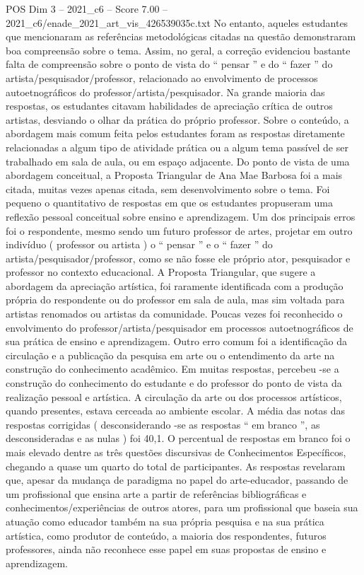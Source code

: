 \begin{textsample}{POS Dim 3 – 2021\_c6 – Score 7.00 – 2021\_c6/enade\_2021\_art\_vis\_426539035c.txt}
No entanto, aqueles estudantes que mencionaram as referências metodológicas citadas na questão demonstraram boa compreensão sobre o tema.
Assim, no geral, a correção evidenciou bastante falta de compreensão sobre o ponto de vista do “ pensar ” e do “ fazer ” do artista/pesquisador/professor, relacionado ao envolvimento de processos autoetnográficos do professor/artista/pesquisador.
Na grande maioria das respostas, os estudantes citavam habilidades de apreciação crítica de outros artistas, desviando o olhar da prática do próprio professor.
Sobre o conteúdo, a abordagem mais comum feita pelos estudantes foram as respostas diretamente relacionadas a algum tipo de atividade prática ou a algum tema passível de ser trabalhado em sala de aula, ou em espaço adjacente.
Do ponto de vista de uma abordagem conceitual, a Proposta Triangular de Ana Mae Barbosa foi a mais citada, muitas vezes apenas citada, sem desenvolvimento sobre o tema.
Foi pequeno o quantitativo de respostas em que os estudantes propuseram uma reflexão pessoal conceitual sobre ensino e aprendizagem.
Um dos principais erros foi o respondente, mesmo sendo um futuro professor de artes, projetar em outro indivíduo ( professor ou artista ) o “ pensar ” e o “ fazer ” do artista/pesquisador/professor, como se não fosse ele próprio ator, pesquisador e professor no contexto educacional.
A Proposta Triangular, que sugere a abordagem da apreciação artística, foi raramente identificada com a produção própria do respondente ou do professor em sala de aula, mas sim voltada para artistas renomados ou artistas da comunidade.
Poucas vezes foi reconhecido o envolvimento do professor/artista/pesquisador em processos autoetnográficos de sua prática de ensino e aprendizagem.
Outro erro comum foi a identificação da circulação e a publicação da pesquisa em arte ou o entendimento da arte na construção do conhecimento acadêmico.
Em muitas respostas, percebeu -se a construção do conhecimento do estudante e do professor do ponto de vista da realização pessoal e artística.
A circulação da arte ou dos processos artísticos, quando presentes, estava cerceada ao ambiente escolar.
A média das notas das respostas corrigidas ( desconsiderando -se as respostas “ em branco ”, as desconsideradas e as nulas ) foi 40,1.
O percentual de respostas em branco foi o mais elevado dentre as três questões discursivas de Conhecimentos Específicos, chegando a quase um quarto do total de participantes.
As respostas revelaram que, apesar da mudança de paradigma no papel do arte-educador, passando de um profissional que ensina arte a partir de referências bibliográficas e conhecimentos/experiências de outros atores, para um profissional que baseia sua atuação como educador também na sua própria pesquisa e na sua prática artística, como produtor de conteúdo, a maioria dos respondentes, futuros professores, ainda não reconhece esse papel em suas propostas de ensino e aprendizagem.

\end{textsample}

